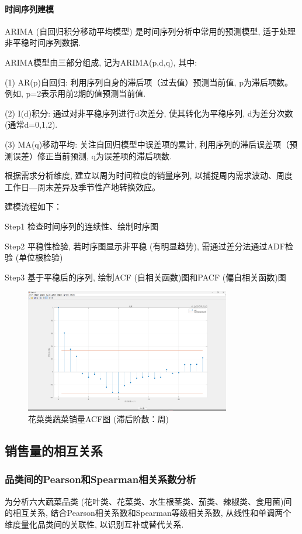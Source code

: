 \documentclass{cumcmthesis}
\begin{document}
\paragraph{时间序列建模}
ARIMA (自回归积分移动平均模型) 是时间序列分析中常用的预测模型, 适于处理非平稳时间序列数据. 

ARIMA模型由三部分组成, 记为ARIMA(p,d,q), 其中: 


(1) AR(p)自回归: 利用序列自身的滞后项（过去值）预测当前值, p为滞后项数。例如, p=2表示用前2期的值预测当前值. 

(2) I(d)积分: 通过对非平稳序列进行d次差分, 使其转化为平稳序列, d为差分次数 (通常d=0,1,2). 

(3) MA(q)移动平均: 关注自回归模型中误差项的累计, 利用序列的滞后误差项（预测误差）修正当前预测, q为误差项的滞后项数. 

根据需求分析维度, 建立以周为时间粒度的销量序列, 以捕捉周内需求波动、周度工作日—周末差异及季节性产地转换效应。  

建模流程如下：  


Step1 检查时间序列的连续性、绘制时序图  

Step2 平稳性检验, 若时序图显示非平稳 (有明显趋势), 需通过差分法通过ADF检验 (单位根检验)  

Step3 基于平稳后的序列, 绘制ACF (自相关函数)图和PACF (偏自相关函数)图  

\begin{figure}[H]
    \centering
    \includegraphics[width=0.8\textwidth]{花菜ACF图.png} 
    \caption{花菜类蔬菜销量ACF图 (滞后阶数：周)}
\end{figure}

\subsection{销售量的相互关系}

\subsubsection{品类间的Pearson和Spearman相关系数分析}
为分析六大蔬菜品类 (花叶类、花菜类、水生根茎类、茄类、辣椒类、食用菌)间的相互关系, 结合Pearson相关系数和Spearman等级相关系数, 从线性和单调两个维度量化品类间的关联性, 以识别互补或替代关系. 
\end{document}
